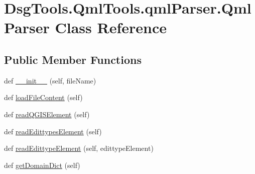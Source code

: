 \hypertarget{class_dsg_tools_1_1_qml_tools_1_1qml_parser_1_1_qml_parser}{}\section{Dsg\+Tools.\+Qml\+Tools.\+qml\+Parser.\+Qml\+Parser Class Reference}
\label{class_dsg_tools_1_1_qml_tools_1_1qml_parser_1_1_qml_parser}
\subsection*{Public Member Functions}
\begin{DoxyCompactItemize}
\item 
def \mbox{\hyperlink{class_dsg_tools_1_1_qml_tools_1_1qml_parser_1_1_qml_parser_a77ad18b9c2210e1c4cf6b2e56e430830}{\+\_\+\+\_\+init\+\_\+\+\_\+}} (self, file\+Name)
\item 
def \mbox{\hyperlink{class_dsg_tools_1_1_qml_tools_1_1qml_parser_1_1_qml_parser_a11dae4c91d4e530b145265047b6f20de}{load\+File\+Content}} (self)
\item 
def \mbox{\hyperlink{class_dsg_tools_1_1_qml_tools_1_1qml_parser_1_1_qml_parser_a500f38b0f41d855bc2679c6287ffff37}{read\+Q\+G\+I\+S\+Element}} (self)
\item 
def \mbox{\hyperlink{class_dsg_tools_1_1_qml_tools_1_1qml_parser_1_1_qml_parser_a711bc4f9cf1e4a41d115cf8d2713a2ee}{read\+Edittypes\+Element}} (self)
\item 
def \mbox{\hyperlink{class_dsg_tools_1_1_qml_tools_1_1qml_parser_1_1_qml_parser_a76b213f382b5af36a915fc319f6d24bc}{read\+Edittype\+Element}} (self, edittype\+Element)
\item 
def \mbox{\hyperlink{class_dsg_tools_1_1_qml_tools_1_1qml_parser_1_1_qml_parser_ac9fb4cabff860abb0988781310f19ea9}{get\+Domain\+Dict}} (self)
\end{DoxyCompactItemize}
